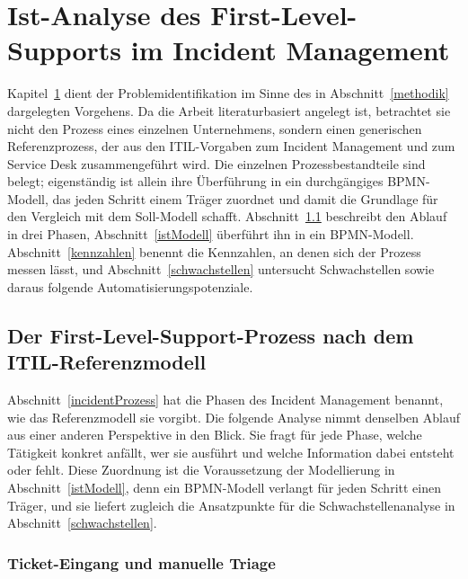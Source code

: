 \section{Ist-Analyse des First-Level-Supports im Incident Management}
\label{istAnalyse}

Kapitel~\ref{istAnalyse} dient der Problemidentifikation im Sinne des in Abschnitt~\ref{methodik} dargelegten Vorgehens. Da die Arbeit literaturbasiert angelegt ist, betrachtet sie nicht den Prozess eines einzelnen Unternehmens, sondern einen generischen Referenzprozess, der aus den ITIL-Vorgaben zum Incident Management und zum Service Desk zusammengef\"uhrt wird. Die einzelnen Prozessbestandteile sind belegt; eigenst\"andig ist allein ihre \"Uberf\"uhrung in ein durchg\"angiges BPMN-Modell, das jeden Schritt einem Tr\"ager zuordnet und damit die Grundlage f\"ur den Vergleich mit dem Soll-Modell schafft. Abschnitt~\ref{istProzess} beschreibt den Ablauf in drei Phasen, Abschnitt~\ref{istModell} \"uberf\"uhrt ihn in ein BPMN-Modell. Abschnitt~\ref{kennzahlen} benennt die Kennzahlen, an denen sich der Prozess messen l\"asst, und Abschnitt~\ref{schwachstellen} untersucht Schwachstellen sowie daraus folgende Automatisierungspotenziale.

\subsection{Der First-Level-Support-Prozess nach dem ITIL-Referenzmodell}
\label{istProzess}

Abschnitt~\ref{incidentProzess} hat die Phasen des Incident Management benannt, wie das Referenzmodell sie vorgibt. Die folgende Analyse nimmt denselben Ablauf aus einer anderen Perspektive in den Blick. Sie fragt f\"ur jede Phase, welche T\"atigkeit konkret anf\"allt, wer sie ausf\"uhrt und welche Information dabei entsteht oder fehlt. Diese Zuordnung ist die Voraussetzung der Modellierung in Abschnitt~\ref{istModell}, denn ein BPMN-Modell verlangt f\"ur jeden Schritt einen Tr\"ager, und sie liefert zugleich die Ansatzpunkte f\"ur die Schwachstellenanalyse in Abschnitt~\ref{schwachstellen}.

\subsubsection{Ticket-Eingang und manuelle Triage}


